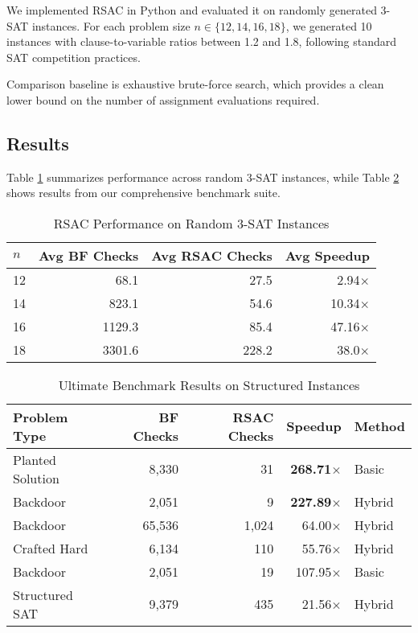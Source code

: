 \documentclass[conference]{IEEEtran}
\begin{document}
We implemented RSAC in Python and evaluated it on randomly generated 3-SAT instances. For each problem size $n \in \{12, 14, 16, 18\}$, we generated 10 instances with clause-to-variable ratios between 1.2 and 1.8, following standard SAT competition practices.

Comparison baseline is exhaustive brute-force search, which provides a clean lower bound on the number of assignment evaluations required.

\subsection{Results}

Table \ref{tab:results} summarizes performance across random 3-SAT instances, while Table \ref{tab:ultimate} shows results from our comprehensive benchmark suite.

\begin{table}[h]
\centering
\caption{RSAC Performance on Random 3-SAT Instances}
\label{tab:results}
\begin{tabular}{@{}lrrr@{}}
\toprule
$n$ & Avg BF Checks & Avg RSAC Checks & Avg Speedup \\
\midrule
12 & 68.1 & 27.5 & 2.94$\times$ \\
14 & 823.1 & 54.6 & 10.34$\times$ \\
16 & 1129.3 & 85.4 & 47.16$\times$ \\
18 & 3301.6 & 228.2 & 38.0$\times$ \\
\bottomrule
\end{tabular}
\end{table}

\begin{table}[h]
\centering
\caption{Ultimate Benchmark Results on Structured Instances}
\label{tab:ultimate}
\begin{tabular}{@{}lrrrl@{}}
\toprule
Problem Type & BF Checks & RSAC Checks & Speedup & Method \\
\midrule
Planted Solution & 8,330 & 31 & \textbf{268.71$\times$} & Basic \\
Backdoor & 2,051 & 9 & \textbf{227.89$\times$} & Hybrid \\
Backdoor & 65,536 & 1,024 & 64.00$\times$ & Hybrid \\
Crafted Hard & 6,134 & 110 & 55.76$\times$ & Hybrid \\
Backdoor & 2,051 & 19 & 107.95$\times$ & Basic \\
Structured SAT & 9,379 & 435 & 21.56$\times$ & Hybrid \\
\bottomrule
\end{tabular}
\end{table}
\end{document}
